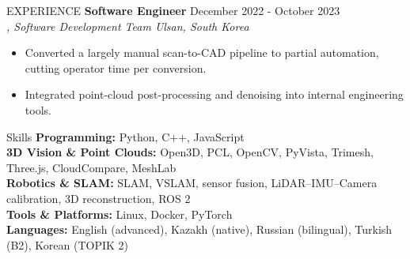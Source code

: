 \documentclass{resume} %
\begin{document}
\begin{rSection}{EXPERIENCE}
\vspace{-0.15cm}
\textbf{Software Engineer} \hfill December 2022 - October 2023\\
\textit{{\href{http://www.klabs.co.kr/en}{\color{blue}{K-Labs}}}, {Software Development Team} \hfill {Ulsan, South Korea}} \\

\vspace{-0.75cm}
\begin{itemize}
    \itemsep -7pt {}
    \item Converted a largely manual scan-to-CAD pipeline to partial automation, cutting operator time per conversion.
    \item Integrated point-cloud post-processing and denoising into internal engineering tools.
\end{itemize}

\end{rSection}


\vspace{-0.3cm}
\begin{rSection}{Skills}
\vspace{-0.05cm}
\textbf{Programming:}{ Python, C++, JavaScript} \\
\textbf{3D Vision \& Point Clouds:}{ Open3D, PCL, OpenCV, PyVista, Trimesh, Three.js, CloudCompare, MeshLab} \\
\textbf{Robotics \& SLAM:}{ SLAM, VSLAM, sensor fusion, LiDAR--IMU--Camera calibration, 3D reconstruction, ROS 2} \\
\textbf{Tools \& Platforms:}{ Linux, Docker, PyTorch} \\
\textbf{Languages:}{ English (advanced), Kazakh (native), Russian (bilingual), Turkish (B2), Korean (TOPIK 2)}
\end{rSection}

\end{document}
